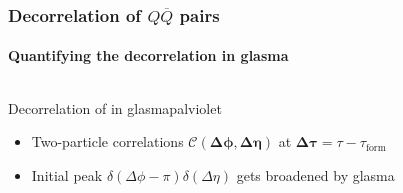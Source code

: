 \documentclass[aspectratio=169,11pt,usenames,dvipsnames]{beamer}
\begin{document}
\begin{frame}[noframenumbering]
    \frametitle{Decorrelation of $Q\overline{Q}$ pairs}
    \framesubtitle{Quantifying the decorrelation in glasma}
    \vspace{-15pt}
    \begin{center}
        \begin{columns}[onlytextwidth,t]
           \begin{center}
                \begin{custombox2}{\normalsize Decorrelation of in glasma}{palviolet}
                    \small
                    \begin{varwidth}{1.02\textwidth}
                    \begin{itemize}\itemsep0em 
                        \itemsep0em
                        \footnotesize
                        \item Two-particle correlations $\boldsymbol{\mathcal{C}(\Delta\phi, \Delta\eta)}$ at $\boldsymbol{\Delta\tau}=\tau-\tau_\mathrm{form}$
                        \item Initial peak $\delta(\Delta\phi-\pi)\delta(\Delta\eta)$ gets broadened by glasma
                    \end{itemize}
                    \end{varwidth}
                \end{custombox2}
                

\end{center}
\end{columns}
\end{center}
\end{frame}
\end{document}

